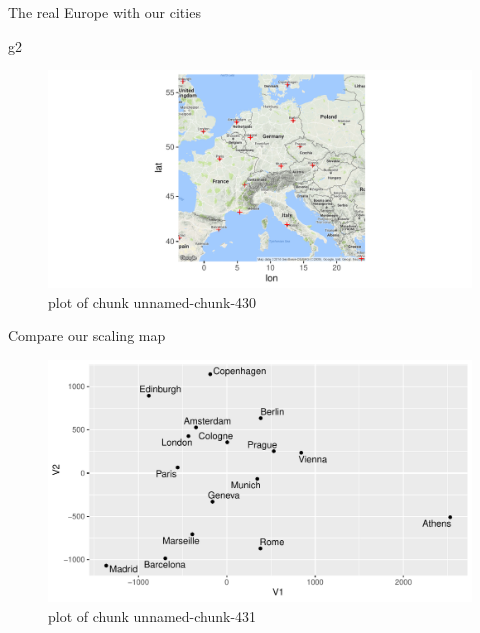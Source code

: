 \documentclass[ignorenonframetext,]{beamer}
\newenvironment{Shaded}{\begin{snugshade}}{\end{snugshade}}
\newcommand{\NormalTok}[1]{#1}
\begin{document}
\begin{frame}[fragile]{The real Europe with our cities}
\protect\hypertarget{the-real-europe-with-our-cities}{}

\begin{Shaded}
\begin{Highlighting}[]
\NormalTok{g2}
\end{Highlighting}
\end{Shaded}

\begin{figure}
\centering
\includegraphics{figure/unnamed-chunk-430-1.pdf}
\caption{plot of chunk unnamed-chunk-430}
\end{figure}

\end{frame}

\begin{frame}{Compare our scaling map}
\protect\hypertarget{compare-our-scaling-map}{}

\begin{figure}
\centering
\includegraphics{figure/unnamed-chunk-431-1.pdf}
\caption{plot of chunk unnamed-chunk-431}
\end{figure}

\end{frame}
\end{document}

